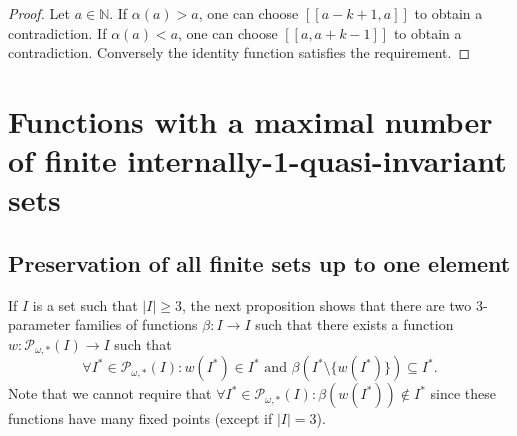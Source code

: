 \documentclass[a4paper,11pt]{article}
\theoremstyle{plain}
\theoremstyle{definition}
\theoremstyle{remark}
\begin{document}
\begin{proof}
Let $a \in \mathbb{N}$. If $\alpha(a) > a$, one can choose $[\![a-k+1,a]\!]$ to obtain a contradiction. If $\alpha(a) < a$, one can choose $[\![a,a+k-1]\!]$ to obtain a contradiction. Conversely the identity function satisfies the requirement.
\end{proof}








\section{Functions with a maximal number of finite internally-1-quasi-invariant sets}
\label{sectionPreservUnderDirectImageUpToOneElement}

\subsection{Preservation of all finite sets up to one element}

If $I$ is a set such that $|I| \geq 3$, the next proposition shows that there are two 3-parameter families of functions $\beta : I \to I$ such that there exists a function $w : \mathcal{P}_{\omega,*}(I) \to I$ such that 
\[ \forall I^* \in \mathcal{P}_{\omega,*}(I) : w(I^*) \in I^* \text{ and } \beta(I^* \setminus \{w(I^*) \}) \subseteq I^*. \] Note that we cannot require that $\forall I^* \in \mathcal{P}_{\omega,*}(I) : \beta(w(I^*)) \notin I^*$ since these functions have many fixed points (except if $|I| = 3$).
\end{document}
